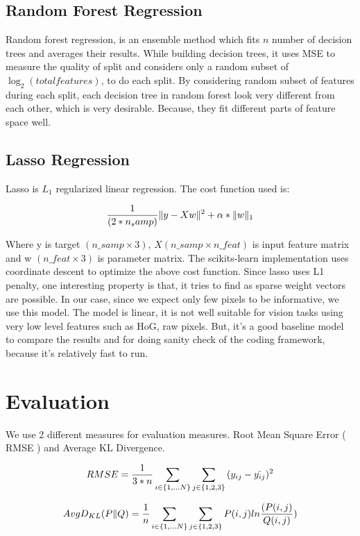 \documentclass[10pt]{article}
\begin{document}
\subsection*{Random Forest Regression} 

Random forest regression, is an ensemble method which fits $n$ number of decision trees and averages their results. While building decision trees, it uses MSE to measure the quality of split and considers only a random subset of $ \log_2(total features)$, to do each split. By considering random subset of features during each split, each decision tree in random forest look very different from each other, which is very desirable. Because, they fit different parts of feature space well.  

\subsection*{Lasso Regression}

Lasso is $L_1$ regularized linear regression. The cost function used is:

$${1 \over (2*n_samp)} \| y -Xw \|^2 + \alpha * \| w \|_1$$

Where y is target $(n\_samp \times 3)$, $X (n\_samp \times n\_feat)$ is input feature matrix and w $(n\_feat \times 3)$ is parameter matrix. The scikits-learn implementation uses coordinate descent to optimize the above cost function. Since lasso uses L1 penalty, one interesting property is that, it tries to find as sparse weight vectors are possible. In our case, since we expect only few pixels to be informative, we use this model. The model is linear, it is not well suitable for vision tasks using very low level features such as HoG, raw pixels. But, it's a good baseline model to compare the results and for doing sanity check of the coding framework, because it's relatively fast to run.

\section*{Evaluation}

We use 2 different measures for evaluation measures. Root Mean Square Error ( RMSE ) and Average KL Divergence.

$$RMSE = {1 \over 3*n} \sum_{i \in \{1, ... N\}} \sum_{j \in \{1, 2, 3\} }{ (y_{ij} - \hat{y_{ij}})^2 }$$

$$Avg D_{KL}(P \| Q)= {1 \over n} \sum_{i \in \{1, ... N\}} \sum_{j \in \{1, 2, 3\} }{ P(i, j) ln{( P(i, j) \over Q(i, j)} ) }$$
\end{document}
